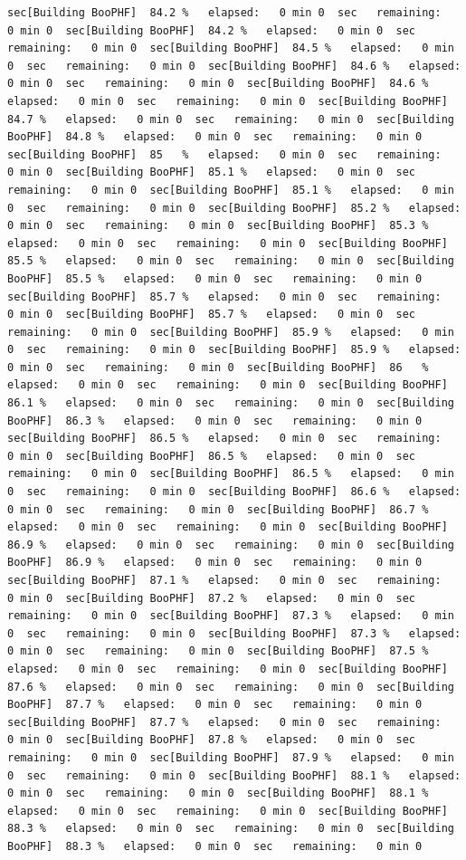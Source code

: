 \documentclass[
]{book}
\begin{document}
\begin{verbatim}
sec[Building BooPHF]  84.2 %   elapsed:   0 min 0  sec   remaining:   0 min 0  sec[Building BooPHF]  84.2 %   elapsed:   0 min 0  sec   remaining:   0 min 0  sec[Building BooPHF]  84.5 %   elapsed:   0 min 0  sec   remaining:   0 min 0  sec[Building BooPHF]  84.6 %   elapsed:   0 min 0  sec   remaining:   0 min 0  sec[Building BooPHF]  84.6 %   elapsed:   0 min 0  sec   remaining:   0 min 0  sec[Building BooPHF]  84.7 %   elapsed:   0 min 0  sec   remaining:   0 min 0  sec[Building BooPHF]  84.8 %   elapsed:   0 min 0  sec   remaining:   0 min 0  sec[Building BooPHF]  85   %   elapsed:   0 min 0  sec   remaining:   0 min 0  sec[Building BooPHF]  85.1 %   elapsed:   0 min 0  sec   remaining:   0 min 0  sec[Building BooPHF]  85.1 %   elapsed:   0 min 0  sec   remaining:   0 min 0  sec[Building BooPHF]  85.2 %   elapsed:   0 min 0  sec   remaining:   0 min 0  sec[Building BooPHF]  85.3 %   elapsed:   0 min 0  sec   remaining:   0 min 0  sec[Building BooPHF]  85.5 %   elapsed:   0 min 0  sec   remaining:   0 min 0  sec[Building BooPHF]  85.5 %   elapsed:   0 min 0  sec   remaining:   0 min 0  sec[Building BooPHF]  85.7 %   elapsed:   0 min 0  sec   remaining:   0 min 0  sec[Building BooPHF]  85.7 %   elapsed:   0 min 0  sec   remaining:   0 min 0  sec[Building BooPHF]  85.9 %   elapsed:   0 min 0  sec   remaining:   0 min 0  sec[Building BooPHF]  85.9 %   elapsed:   0 min 0  sec   remaining:   0 min 0  sec[Building BooPHF]  86   %   elapsed:   0 min 0  sec   remaining:   0 min 0  sec[Building BooPHF]  86.1 %   elapsed:   0 min 0  sec   remaining:   0 min 0  sec[Building BooPHF]  86.3 %   elapsed:   0 min 0  sec   remaining:   0 min 0  sec[Building BooPHF]  86.5 %   elapsed:   0 min 0  sec   remaining:   0 min 0  sec[Building BooPHF]  86.5 %   elapsed:   0 min 0  sec   remaining:   0 min 0  sec[Building BooPHF]  86.5 %   elapsed:   0 min 0  sec   remaining:   0 min 0  sec[Building BooPHF]  86.6 %   elapsed:   0 min 0  sec   remaining:   0 min 0  sec[Building BooPHF]  86.7 %   elapsed:   0 min 0  sec   remaining:   0 min 0  sec[Building BooPHF]  86.9 %   elapsed:   0 min 0  sec   remaining:   0 min 0  sec[Building BooPHF]  86.9 %   elapsed:   0 min 0  sec   remaining:   0 min 0  sec[Building BooPHF]  87.1 %   elapsed:   0 min 0  sec   remaining:   0 min 0  sec[Building BooPHF]  87.2 %   elapsed:   0 min 0  sec   remaining:   0 min 0  sec[Building BooPHF]  87.3 %   elapsed:   0 min 0  sec   remaining:   0 min 0  sec[Building BooPHF]  87.3 %   elapsed:   0 min 0  sec   remaining:   0 min 0  sec[Building BooPHF]  87.5 %   elapsed:   0 min 0  sec   remaining:   0 min 0  sec[Building BooPHF]  87.6 %   elapsed:   0 min 0  sec   remaining:   0 min 0  sec[Building BooPHF]  87.7 %   elapsed:   0 min 0  sec   remaining:   0 min 0  sec[Building BooPHF]  87.7 %   elapsed:   0 min 0  sec   remaining:   0 min 0  sec[Building BooPHF]  87.8 %   elapsed:   0 min 0  sec   remaining:   0 min 0  sec[Building BooPHF]  87.9 %   elapsed:   0 min 0  sec   remaining:   0 min 0  sec[Building BooPHF]  88.1 %   elapsed:   0 min 0  sec   remaining:   0 min 0  sec[Building BooPHF]  88.1 %   elapsed:   0 min 0  sec   remaining:   0 min 0  sec[Building BooPHF]  88.3 %   elapsed:   0 min 0  sec   remaining:   0 min 0  sec[Building BooPHF]  88.3 %   elapsed:   0 min 0  sec   remaining:   0 min 0  
\end{verbatim}
\end{document}
